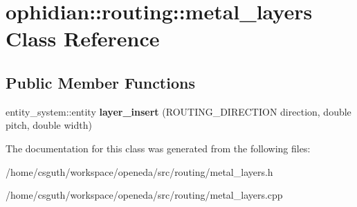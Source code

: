 \hypertarget{classophidian_1_1routing_1_1metal__layers}{\section{ophidian\-:\-:routing\-:\-:metal\-\_\-layers Class Reference}
\label{classophidian_1_1routing_1_1metal__layers}
}
\subsection*{Public Member Functions}
\begin{DoxyCompactItemize}
\item 
\hypertarget{classophidian_1_1routing_1_1metal__layers_a37249a1562b21639f564761a8703f0b3}{entity\-\_\-system\-::entity {\bfseries layer\-\_\-insert} (R\-O\-U\-T\-I\-N\-G\-\_\-\-D\-I\-R\-E\-C\-T\-I\-O\-N direction, double pitch, double width)}\label{classophidian_1_1routing_1_1metal__layers_a37249a1562b21639f564761a8703f0b3}

\end{DoxyCompactItemize}


The documentation for this class was generated from the following files\-:\begin{DoxyCompactItemize}
\item 
/home/csguth/workspace/openeda/src/routing/metal\-\_\-layers.\-h\item 
/home/csguth/workspace/openeda/src/routing/metal\-\_\-layers.\-cpp\end{DoxyCompactItemize}
